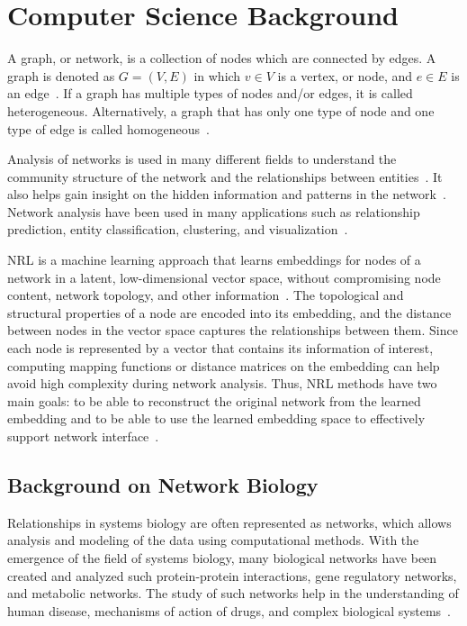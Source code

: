 \chapter{Computer Science Background}
\label{ch:computerscience}

A graph, or network, is a collection of nodes which are connected by edges.
A graph is denoted as $G=(V,E)$ in which $v \in V$ is a vertex, or node, and $e \in E$ is an edge~\cite{cai_comprehensive_2017}.
If a graph has multiple types of nodes and/or edges, it is called heterogeneous.
Alternatively, a graph that has only one type of node and one type of edge is called homogeneous~\cite{cai_comprehensive_2017}.

Analysis of networks is used in many different fields to understand the community structure of the network and the relationships between entities~\cite{cai_comprehensive_2017}.
It also helps gain insight on the hidden information and patterns in the network~\cite{cai_comprehensive_2017}.
Network analysis have been used in many applications such as relationship prediction, entity classification, clustering, and visualization~\cite{goyal_graph_2018}.

\ac{NRL} is a machine learning approach that learns embeddings for nodes of a network in a latent, low-dimensional vector space, without compromising node content, network topology, and other information~\cite{zhang_network_2017}.
The topological and structural properties of a node are encoded into its embedding, and the distance between nodes in the vector space captures the relationships between them.
Since each node is represented by a vector that contains its information of interest, computing mapping functions or distance matrices on the embedding can help avoid high complexity during network analysis.
Thus, \ac{NRL} methods have two main goals: to be able to reconstruct the original network from the learned embedding and to be able to use the learned embedding space to effectively support network interface~\cite{sheikh_gat2vec:_2018}.

\section{Background on Network Biology}

Relationships in systems biology are often represented as networks, which allows analysis and modeling of the data using computational methods.
With the emergence of the field of systems biology, many biological networks have been created and analyzed such protein-protein interactions, gene regulatory networks, and metabolic networks.
The study of such networks help in the understanding of human disease, mechanisms of action of drugs, and complex biological systems~\cite{dancik_properties_2013}.

